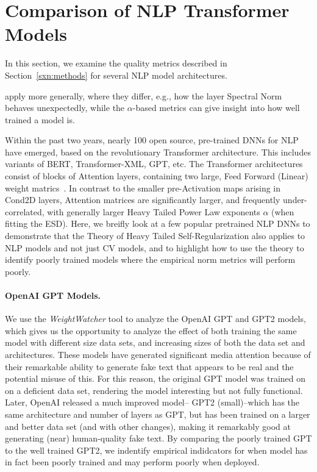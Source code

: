 \section{Comparison of NLP Transformer Models}
\label{sxn:nlp}

In this section, we examine the quality metrics described in Section~\ref{sxn:methods} for several NLP model architectures.


apply more generally, where they differ, e.g., how the layer Spectral Norm behaves unexpectedly, while the $\alpha$-based metrics can give insight into how well trained a model is.



Within the past two years, nearly 100 open source, pre-trained DNNs for NLP have emerged, based on the revolutionary Transformer architecture.
This includes variants of BERT, Transformer-XML, GPT, etc.
The Transformer architectures consist of blocks of Attention layers, containing two large, Feed Forward (Linear) weight matrics~\cite{Attn2017}. 
In contrast to the smaller pre-Activation maps arising in Cond2D layers, Attention matrices are significantly larger, 
and frequently under-correlated, with generally larger Heavy Tailed Power Law exponents $\alpha$ (when fitting the ESD).  
Here, we breifly look at a few popular pretrained NLP DNNs to demonstrate that the Theory of Heavy Tailed Self-Regularization also
applies to NLP models and not just CV models, and to highlight how to use the theory to identify
poorly trained models where the empirical norm metrics will perform poorly.

\paragraph{OpenAI GPT Models.}

We use the \emph{WeightWatcher} tool to analyze the OpenAI GPT and GPT2 models, which gives us
the opportunity to analyze the effect of both training the same model with different size data sets,
and increasing sizes of both the data set and architectures.
These models have generated significant media attention because of their remarkable ability to
 generate fake text that appears to be real and the potential misuse of this.
For this reason, the original GPT model was trained on on a deficient data set, rendering
the model interesting but not fully functional.  Later, OpenAI released a much improved model--
GPT2 (small)--which has the same architecture and number of layers as GPT, but has
been trained on a larger and better data set (and with other changes), making it
remarkably good at generating (near) human-quality fake text.  
By comparing the poorly trained GPT to the well trained GPT2, we
indentify empirical indidcators for when  model has in fact
been poorly trained and may perform poorly when deployed.

